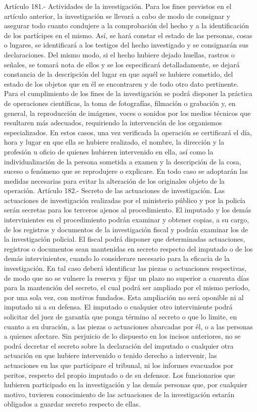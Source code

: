     Artículo 181.- Actividades de la investigación. Para los fines previstos en el artículo anterior, la investigación se llevará a cabo de modo de consignar y asegurar todo cuanto condujere a la comprobación del hecho y a la identificación de los partícipes en el mismo. Así, se hará constar el estado de las personas, cosas o lugares, se identificará a los testigos del hecho investigado y se consignarán sus declaraciones. Del mismo modo, si el hecho hubiere dejado huellas, rastros o señales, se tomará nota de ellos y se los especificará detalladamente, se dejará constancia de la descripción del lugar en que aquél se hubiere cometido, del estado de los objetos que en él se encontraren y de todo otro dato pertinente.
    Para el cumplimiento de los fines de la investigación se podrá disponer la práctica de operaciones científicas, la toma de fotografías, filmación o grabación y, en general, la reproducción de imágenes, voces o sonidos por los medios técnicos que resultaren más adecuados, requiriendo la intervención de los organismos especializados. En estos casos, una vez verificada la operación se certificará el día, hora y lugar en que ella se hubiere realizado, el nombre, la dirección y la profesión u oficio de quienes hubieren intervenido en ella, así como la individualización de la persona sometida a examen y la descripción de la cosa, suceso o fenómeno que se reprodujere o explicare. En todo caso se adoptarán las medidas necesarias para evitar la alteración de los originales objeto de la operación.
    Artículo 182.- Secreto de las actuaciones de investigación. Las actuaciones de investigación realizadas por el ministerio público y por la policía serán secretas para los terceros ajenos al procedimiento.
    El imputado y los demás intervinientes en el procedimiento podrán examinar y obtener copias, a su cargo, de los registros y documentos de la investigación fiscal y podrán examinar los de la investigación policial.
    El fiscal podrá disponer que determinadas actuaciones, registros o documentos sean mantenidas en secreto respecto del imputado o de los demás intervinientes, cuando lo considerare necesario para la eficacia de la investigación. En tal caso deberá identificar las piezas o actuaciones respectivas, de modo que no se vulnere la reserva y fijar un plazo no superior a cuarenta días para la mantención del secreto, el cual podrá ser ampliado por el mismo período, por una sola vez, con motivos fundados. Esta ampliación no será oponible ni al imputado ni a su defensa.
    El imputado o cualquier otro interviniente podrá solicitar del juez de garantía que ponga término al secreto o que lo limite, en cuanto a su duración, a las piezas o actuaciones abarcadas por él, o a las personas a quienes afectare.
    Sin perjuicio de lo dispuesto en los incisos anteriores, no se podrá decretar el secreto sobre la declaración del imputado o cualquier otra actuación en que hubiere intervenido o tenido derecho a intervenir, las actuaciones en las que participare el tribunal, ni los informes evacuados por peritos, respecto del propio imputado o de su defensor.
    Los funcionarios que hubieren participado en la investigación y las demás personas que, por cualquier motivo, tuvieren conocimiento de las actuaciones de la investigación estarán obligados a guardar secreto respecto de ellas.


